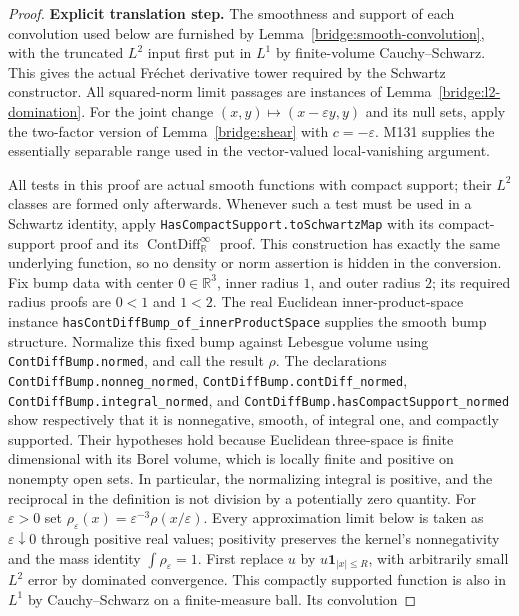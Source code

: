 \documentclass[11pt,a4paper]{article}
\theoremstyle{definition}
\theoremstyle{remark}
\begin{document}
\begin{proof}
\noindent\textbf{Explicit translation step.} The smoothness and support of each convolution used below are furnished
by Lemma~\ref{bridge:smooth-convolution}, with the truncated $L^2$ input
first put in $L^1$ by finite-volume Cauchy--Schwarz. This gives the actual
Fr\'echet derivative tower required by the Schwartz constructor. All
squared-norm limit passages are instances of
Lemma~\ref{bridge:l2-domination}. For the joint change
$(x,y)\mapsto(x-\varepsilon y,y)$ and its null sets, apply
the two-factor version of Lemma~\ref{bridge:shear} with $c=-\varepsilon$. M131 supplies the essentially separable range used in the
vector-valued local-vanishing argument.

All tests in this proof are actual smooth functions with compact support;
their $L^2$ classes are formed only afterwards. Whenever such a test must
be used in a Schwartz identity, apply
\nolinkurl{HasCompactSupport.toSchwartzMap} with its compact-support proof
and its $\operatorname{ContDiff}_{\mathbb R}^{\infty}$ proof. This
construction has exactly the same underlying function, so no density or
norm assertion is hidden in the conversion.
Fix bump data with center $0\in\mathbb R^3$, inner radius $1$,
and outer radius $2$; its required radius proofs are $0<1$ and $1<2$.
The real Euclidean inner-product-space instance
\nolinkurl{hasContDiffBump_of_innerProductSpace} supplies the smooth
bump structure. Normalize this fixed bump against Lebesgue volume
using \nolinkurl{ContDiffBump.normed}, and call the result $\rho$.
The declarations \nolinkurl{ContDiffBump.nonneg_normed},
\nolinkurl{ContDiffBump.contDiff_normed},
\nolinkurl{ContDiffBump.integral_normed}, and
\nolinkurl{ContDiffBump.hasCompactSupport_normed} show respectively
that it is nonnegative, smooth, of integral one, and compactly
supported. Their hypotheses hold because Euclidean three-space is
finite dimensional with its Borel volume, which is locally finite
and positive on nonempty open sets. In particular, the normalizing
integral is positive, and the reciprocal in the definition is not
division by a potentially zero quantity.
For $\varepsilon>0$ set
$\rho_\varepsilon(x)=\varepsilon^{-3}\rho(x/\varepsilon)$.
Every approximation limit below is taken as $\varepsilon\downarrow0$
through positive real values; positivity preserves the kernel's
nonnegativity and the mass identity $\int\rho_\varepsilon=1$.
First replace $u$ by $u\mathbf1_{|x|\leq R}$, with arbitrarily small
$L^2$ error by dominated convergence. This compactly supported function is
also in $L^1$ by Cauchy--Schwarz on a finite-measure ball. Its convolution

\end{proof}
\end{document}
